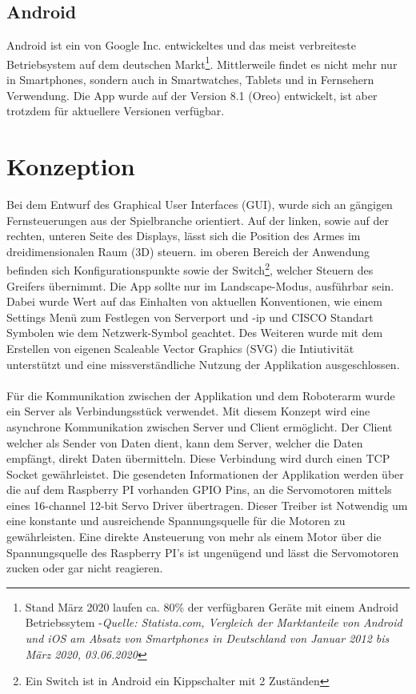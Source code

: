\documentclass[12pt,					%
							 oneside,			%
							 a4paper,			%
							 halfparskip,		%
							 liststotoc,			%
							 bibtotoc,			%
							 fleqn,				%
							 pointlessnumbers]	%
							 {scrreprt}
\begin{document}
\section{Android}
Android ist ein von Google Inc. entwickeltes und das meist verbreiteste Betriebsystem auf dem deutschen Markt\footnote{Stand März 2020 laufen ca. 80\% der verfügbaren Geräte mit einem Android Betriebssytem -\textit{Quelle: Statista.com, \glqq{}Vergleich der Marktanteile von Android und iOS am Absatz von Smartphones in Deutschland von Januar 2012 bis März 2020\grqq{}, 03.06.2020}\cite{Tenzer2020}}. Mittlerweile findet es nicht mehr nur in Smartphones, sondern auch in Smartwatches, Tablets und in Fernsehern Verwendung. Die App wurde auf der Version 8.1 (Oreo) entwickelt, ist aber trotzdem für aktuellere Versionen verfügbar.
\chapter{Konzeption}
Bei dem Entwurf des Graphical User Interfaces (GUI), wurde sich an gängigen Fernsteuerungen aus der Spielbranche orientiert. Auf der linken, sowie auf der rechten, unteren Seite des Displays, lässt sich die Position des Armes im dreidimensionalen Raum (3D) steuern. im oberen Bereich der Anwendung befinden sich Konfigurationspunkte sowie der \glqq{}Switch\grqq{}\footnote{Ein Switch ist in Android ein Kippschalter mit 2 Zuständen}, welcher Steuern des Greifers übernimmt. Die App sollte nur im \glqq{}Landscape\grqq{}-Modus, ausführbar sein. Dabei wurde Wert auf das Einhalten von aktuellen Konventionen, wie einem Settings Menü zum Festlegen von Serverport und -ip und CISCO Standart Symbolen wie dem Netzwerk-Symbol geachtet. Des Weiteren wurde mit dem Erstellen von eigenen Scaleable Vector Graphics (SVG) die Intiutivität unterstützt und eine missverständliche Nutzung der Applikation ausgeschlossen.\\ \\


Für die Kommunikation zwischen der Applikation und dem \glqq{}Roboterarm\grqq{} wurde ein Server als Verbindungsstück verwendet. Mit diesem Konzept wird eine asynchrone Kommunikation zwischen Server und Client ermöglicht. Der Client welcher als Sender von Daten dient, kann dem Server, welcher die Daten empfängt, direkt Daten übermitteln. Diese Verbindung wird durch einen TCP Socket gewährleistet. Die gesendeten Informationen der Applikation werden über die auf dem Raspberry PI vorhanden GPIO Pins, an die Servomotoren mittels eines  \glqq{}16-channel 12-bit Servo Driver\grqq{} übertragen. Dieser Treiber ist Notwendig um eine konstante und ausreichende Spannungsquelle für die Motoren zu gewährleisten. Eine direkte Ansteuerung von mehr als einem Motor über die Spannungsquelle des Raspberry PI's ist ungenügend und lässt die Servomotoren zucken oder gar nicht reagieren.
\end{document}
